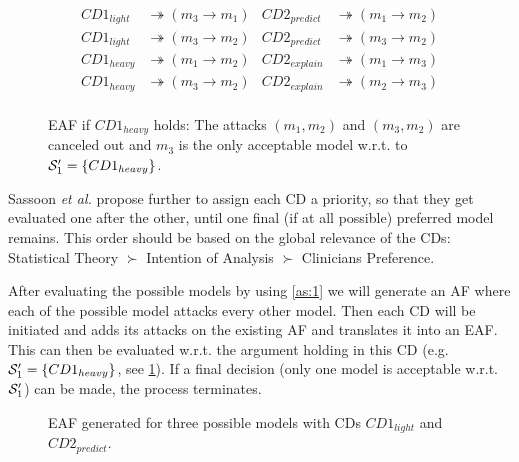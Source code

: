 \begin{align*}
CD1_{light} &\twoheadrightarrow (m_3 \rightarrow m_1) & CD2_{predict} &\twoheadrightarrow (m_1 \rightarrow m_2)\\
CD1_{light} &\twoheadrightarrow (m_3 \rightarrow m_2) & CD2_{predict} &\twoheadrightarrow (m_3 \rightarrow m_2)\\
CD1_{heavy} &\twoheadrightarrow (m_1 \rightarrow m_2) & CD2_{explain} &\twoheadrightarrow (m_1 \rightarrow m_3)\\
CD1_{heavy} &\twoheadrightarrow (m_3 \rightarrow m_2) & CD2_{explain} &\twoheadrightarrow (m_2 \rightarrow m_3)\\
\end{align*}

\begin{figure}[hbtp]
	\centering
	
	\caption{\gls{EAF} if $CD1_{heavy}$ holds: The attacks $(m_1,m_2)$ and $(m_3,m_2)$ are canceled out and $m_3$ is the only acceptable model w.r.t. to $\S_1' = \{CD1_{heavy}\}$.}
	\label{fig:cd1_heavy}
\end{figure}

Sassoon \textit{et al.} propose further to assign each \gls{CD} a priority, so that they get evaluated one after the other, until one final (if at all possible) preferred model remains. This order should be based on the global relevance of the \glspl{CD}: Statistical Theory $\succ$ Intention of Analysis $\succ$ Clinicians Preference. 

After evaluating the possible models by using \autoref{as:1} we will generate an \gls{AF} where each of the possible model attacks every other model. Then each \gls{CD} will be initiated and adds its attacks on the existing \gls{AF} and translates it into an \gls{EAF}. This can then be evaluated w.r.t. the argument holding in this \gls{CD} (e.g. $\S_1' = \{CD1_{heavy}\}$, see \cref{fig:cd1_heavy}). If a final decision (only one model is acceptable w.r.t. $\S_1'$) can be made, the process terminates. 


\begin{figure}[hbtp]
	\hfill
	\caption{\gls{EAF} generated for three possible models with \glspl{CD} $CD1_{light}$ and $CD2_{predict}$.}
	\label{fig:cd1_light_cd2_predict}
\end{figure}



